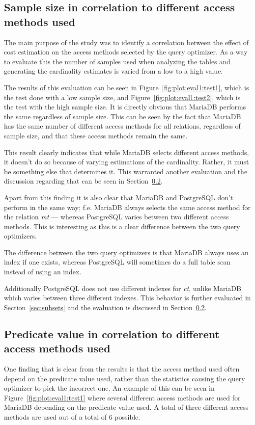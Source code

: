 \subsection{Sample size in correlation to different access methods used}
The main purpose of the study was to identify a correlation between the effect
of cost estimation on the access methods selected by the query optimizer. As a
way to evaluate this the number of samples used when analyzing the tables and
generating the cardinality estimates is varied from a low to a high value.

The results of this evaluation can be seen in Figure~\ref{fig:plot:eval1:test1},
which is the test done with a low sample size, and
Figure~\ref{fig:plot:eval1:test2}, which is the test with the high sample size.
It is directly obvious that MariaDB performs the same regardless of sample size.
This can be seen by the fact that MariaDB has the same number of different
access methods for all relations, regardless of sample size, and that these
access methods remain the same.

This result clearly indicates that while MariaDB selects different access
methods, it doesn't do so because of varying estimations of the cardinality.
Rather, it must be something else that determines it. This warranted another
evaluation and the discussion regarding that can be seen in
Section~\ref{sec:predicatecorrelation}.

Apart from this finding it is also clear that MariaDB and PostgreSQL don't
perform in the same way; f.e. MariaDB always selects the same access method for
the relation \textit{mt} --- whereas PostgreSQL varies between two different access
methods. This is interesting as this is a clear difference between the two query optimizers.

The difference between the two query optimizers is that MariaDB always uses an
index if one exists, whereas PostgreSQL will sometimes do a full table scan
instead of using an index.

Additionally PostgreSQL does not use different indexes for \textit{ct}, unlike
MariaDB which varies between three different indexes. This behavior is further
evaluated in Section~\ref{sec:subsets} and the evaluation is discussed in
Section~\ref{sec:predicatecorrelation}.

\subsection{Predicate value in correlation to different access methods used}\label{sec:predicatecorrelation}
One finding that is clear from the results is that the access method used often
depend on the predicate value used, rather than the statistics causing the query
optimizer to pick the incorrect one. An example of this can be seen in
Figure~\ref{fig:plot:eval1:test1} where several different access methods are
used for MariaDB depending on the predicate value used. A total of three
different access methods are used out of a total of 6 possible.

